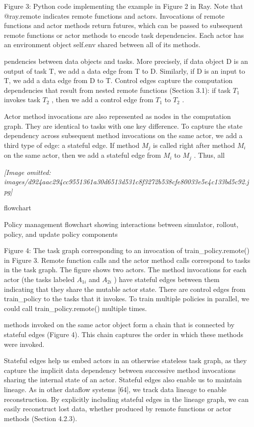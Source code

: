 \documentclass[
]{article}
\begin{document}
Figure 3: Python code implementing the example in Figure 2 in Ray. Note
that @ray.remote indicates remote functions and actors. Invocations of
remote functions and actor methods return futures, which can be passed
to subsequent remote functions or actor methods to encode task
dependencies. Each actor has an environment object self.env shared
between all of its methods.

pendencies between data objects and tasks. More precisely, if data
object D is an output of task T, we add a data edge from T to D.
Similarly, if D is an input to T, we add a data edge from D to T.
Control edges capture the computation dependencies that result from
nested remote functions (Section 3.1): if task \(T_{1}\) invokes task
\(T_{2}\) , then we add a control edge from \(T_{1}\) to \(T_{2}\) .

Actor method invocations are also represented as nodes in the
computation graph. They are identical to tasks with one key difference.
To capture the state dependency across subsequent method invocations on
the same actor, we add a third type of edge: a stateful edge. If method
\(M_{j}\) is called right after method \(M_{i}\) on the same actor, then
we add a stateful edge from \(M_{i}\) to \(M_{j}\) . Thus, all

\textit{[Image omitted: images/d924aac294cc9551361a30d6513d531c8f3272b538cfe80033e5e4c133bd5c92.jpg]}

flowchart

Policy management flowchart showing interactions between simulator,
rollout, policy, and update policy components

Figure 4: The task graph corresponding to an invocation of
train\_policy.remote() in Figure 3. Remote function calls and the actor
method calls correspond to tasks in the task graph. The figure shows two
actors. The method invocations for each actor (the tasks labeled
\(A_{1i}\) and \(A_{2i}\) ) have stateful edges between them indicating
that they share the mutable actor state. There are control edges from
train\_policy to the tasks that it invokes. To train multiple policies
in parallel, we could call train\_policy.remote() multiple times.

methods invoked on the same actor object form a chain that is connected
by stateful edges (Figure 4). This chain captures the order in which
these methods were invoked.

Stateful edges help us embed actors in an otherwise stateless task
graph, as they capture the implicit data dependency between successive
method invocations sharing the internal state of an actor. Stateful
edges also enable us to maintain lineage. As in other dataflow systems
{[}64{]}, we track data lineage to enable reconstruction. By explicitly
including stateful edges in the lineage graph, we can easily reconstruct
lost data, whether produced by remote functions or actor methods
(Section 4.2.3).
\end{document}

